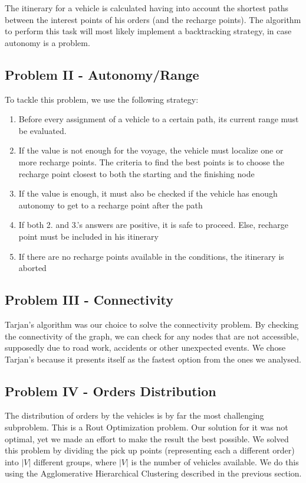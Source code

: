 The itinerary for a vehicle is calculated having into account the shortest paths between the interest points of his orders (and the recharge points). The algorithm to perform this task will most likely implement a backtracking strategy, in case autonomy is a problem.

\subsection{Problem II - Autonomy/Range}
To tackle this problem, we use the following strategy: 
\begin{enumerate}
    \item Before every assignment of a vehicle to a certain path, its current range must be evaluated. 
    \item If the value is not enough for the voyage, the vehicle must localize one or more recharge points. The criteria to find the best points is to choose the recharge point closest to both the starting and the finishing node
    \item If the value is enough, it must also be checked if the vehicle has enough autonomy to get to a recharge point after the path
    \item If both 2. and 3.'s  answers are positive, it is safe to proceed. Else, recharge point must be included in his itinerary
    \item If there are no recharge points available in the conditions, the itinerary is aborted
\end{enumerate}

\subsection{Problem III - Connectivity}
Tarjan's algorithm was our choice to solve the connectivity problem. By checking the connectivity of the graph, we can check for any nodes that are not accessible, supposedly due to road work, accidents or other unexpected events. We chose Tarjan's because it presents itself as the fastest option from the ones we analysed.

\subsection{Problem IV - Orders Distribution}
The distribution of orders by the vehicles is by far the most challenging subproblem. This is a Rout Optimization problem. Our solution for it was not optimal, yet we made an effort to make the result the best possible. We solved this problem by dividing the pick up points (representing each a different order) into $|V|$ different groups, where $|V|$ is the number of vehicles available. We do this using the Agglomerative Hierarchical Clustering described in the previous section.

